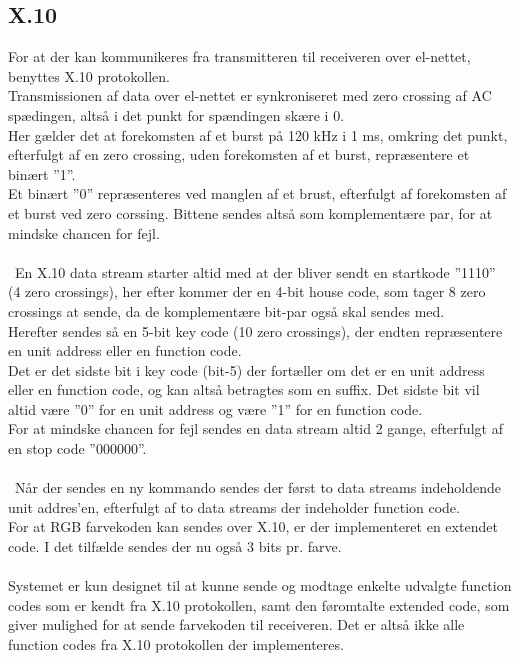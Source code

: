 \documentclass[oneside]{memoir}
\begin{document}
\subsection{X.10}
For at der kan kommunikeres fra transmitteren til receiveren over el-nettet, benyttes X.10 protokollen. \\
Transmissionen af data over el-nettet er synkroniseret med zero crossing af AC spædingen, altså i det punkt for spændingen skære i 0.\\
Her gælder det at forekomsten af et burst på 120 kHz i 1 ms, omkring det punkt, efterfulgt af en zero crossing, uden forekomsten af et burst, repræsentere et binært ”1”. \\
Et binært ”0” repræsenteres ved manglen af et brust, efterfulgt af forekomsten af et burst ved zero corssing. Bittene sendes altså som komplementære par, for at mindske chancen for fejl. 
\\\\\
En X.10 data stream starter altid med at der bliver sendt en startkode ”1110” (4 zero crossings), her efter kommer der en 4-bit house code, som tager 8 zero crossings at sende, da de komplementære bit-par også skal sendes med. \\
Herefter sendes så en 5-bit key code (10 zero crossings), der endten repræsentere en unit address eller en function code. \\
Det er det sidste bit i key code (bit-5) der fortæller om det er en unit address eller en function code, og kan altså betragtes som en suffix. Det sidste bit vil altid være ”0” for en unit address og være ”1” for en function code. \\
For at mindske chancen for fejl sendes en data stream altid 2 gange, efterfulgt af en stop code ”000000”.
\\\\\
Når der sendes en ny kommando sendes der først to data streams indeholdende unit addres’en, efterfulgt af to data streams der indeholder function code. \\
For at RGB farvekoden kan sendes over X.10, er der implementeret en extendet code. I det tilfælde sendes der nu også 3 bits pr. farve. 
\\\\
Systemet er kun designet til at kunne sende og modtage enkelte udvalgte function codes som er kendt fra X.10 protokollen, samt den føromtalte extended code, som giver mulighed for at sende  farvekoden til receiveren. Det er altså ikke alle function codes fra X.10 protokollen der implementeres. 
\end{document}

